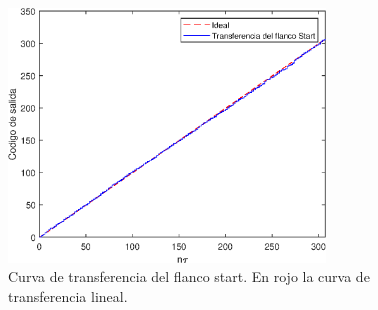 \begin{figure}[H]
     \centering
     \includegraphics[width=0.75\textwidth]{imagenes/transferencia_start.eps}
     \caption{Curva de transferencia del flanco start. En rojo la curva de transferencia
     lineal.}
     \label{fig: transferencia_start}
\end{figure}

